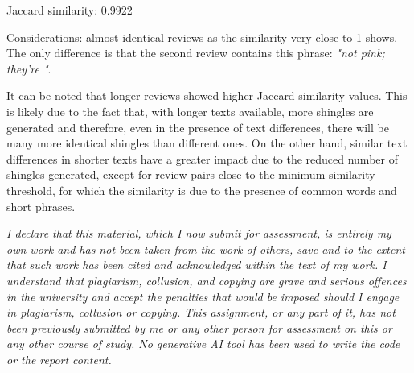 \documentclass[12pt, a4paper]{article}
\begin{document}
\begin{itemize}
{    \item Jaccard similarity: 0.9922
    \item Considerations: almost identical reviews as the similarity very close to 1 shows. The only difference is that the second review contains this phrase: \textit{"not pink; they're "}.
    }
\end{itemize}
\dotfill 

It can be noted that longer reviews showed higher Jaccard similarity values. This is likely due to the fact that, with longer texts available, more shingles are generated and therefore, even in the presence of text differences, there will be many more identical shingles than different ones. On the other hand, similar text differences in shorter texts have a greater impact due to the reduced number of shingles generated, except for review pairs close to the minimum similarity threshold, for which the similarity is due to the presence of common words and short phrases.

\vspace{6cm}

\textit{I declare that this material, which I now submit for assessment, is entirely my own work and has not been taken from the work of others, save and to the extent that such work has been cited and acknowledged within the text of my work. I understand that plagiarism, collusion, and copying are grave and serious offences in the university and accept the penalties that would be imposed should I engage in plagiarism, collusion or copying. This assignment, or any part of it, has not been previously submitted by me or any other person for assessment on this or any other course of study. No generative AI tool has been used to write the code or the report content.}

\vspace{6cm}
\printbibliography
\end{document}
